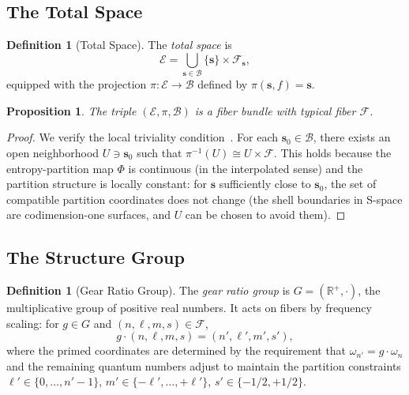 \documentclass[11pt,twocolumn,a4paper]{article}
\newtheorem{proposition}[theorem]{Proposition}
\theoremstyle{definition}
\newtheorem{definition}[theorem]{Definition}
\newcommand{\R}{\mathbb{R}}
\newcommand{\Fib}{\mathcal{F}}
\newcommand{\Bsp}{\mathcal{B}}
\newcommand{\Esp}{\mathcal{E}}
\begin{document}
\subsection{The Total Space}\label{sec:fb:total}

\begin{definition}[Total Space]\label{def:totalspace}
The \emph{total space} is
\begin{equation}\label{eq:totalspace}
  \Esp = \bigcup_{\mathbf{s} \in \Bsp} \{\mathbf{s}\} \times \Fib_{\mathbf{s}},
\end{equation}
equipped with the projection $\pi: \Esp \to \Bsp$ defined by
$\pi(\mathbf{s}, f) = \mathbf{s}$.
\end{definition}

\begin{proposition}\label{prop:bundle_structure}
The triple $(\Esp, \pi, \Bsp)$ is a fiber bundle with typical fiber $\Fib$.
\end{proposition}

\begin{proof}
We verify the local triviality condition~\cite{kobayashi1963,nakahara2003}. For each
$\mathbf{s}_0 \in \Bsp$, there exists an open neighborhood $U \ni \mathbf{s}_0$ such
that $\pi^{-1}(U) \cong U \times \Fib$. This holds because the entropy-partition map
$\Phi$ is continuous (in the interpolated sense) and the partition structure is locally
constant: for $\mathbf{s}$ sufficiently close to $\mathbf{s}_0$, the set of compatible
partition coordinates does not change (the shell boundaries in S-space are
codimension-one surfaces, and $U$ can be chosen to avoid them).
\end{proof}

\subsection{The Structure Group}\label{sec:fb:group}

\begin{definition}[Gear Ratio Group]\label{def:geargroup}
The \emph{gear ratio group} is $G = (\R^+, \cdot)$, the multiplicative group of positive
real numbers. It acts on fibers by frequency scaling: for $g \in G$ and
$(n, \ell, m, s) \in \Fib$,
\begin{equation}\label{eq:group_action}
  g \cdot (n, \ell, m, s) = (n', \ell', m', s'),
\end{equation}
where the primed coordinates are determined by the requirement that $\omega_{n'} = g \cdot \omega_n$
and the remaining quantum numbers adjust to maintain the partition constraints
$\ell' \in \{0, \ldots, n'-1\}$, $m' \in \{-\ell', \ldots, +\ell'\}$, $s' \in \{-1/2, +1/2\}$.
\end{definition}
\end{document}
